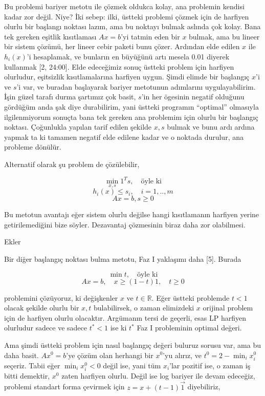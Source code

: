 \documentclass[12pt,fleqn]{article}\usepackage{../../common}
\begin{document}
Bu problemi bariyer metotu ile çözmek oldukca kolay, ana problemin kendisi
kadar zor değil. Niye? İki sebep: ilki, üstteki problemi çözmek için de
harfiyen olurlu bir başlangı noktası lazım, ama bu noktayı bulmak aslında
çok kolay. Bana tek gereken eşitlik kısıtlaması $Ax = b$'yi tatmin eden bir
$x$ bulmak, ama bu lineer bir sistem çözümü, her lineer cebir paketi bunu
çözer. Ardından elde edilen $x$ ile $h_i(x)$'i hesaplamak, ve bunların en
büyüğünü artı mesela 0.01 diyerek kullanmak [2, 24:00]. Elde edeceğimiz
sonuç üstteki problem için harfiyen olurludur, eşitsizlik kısıtlamalarına
harfiyen uygun. Şimdi elimde bir başlangıç $x$'i ve $s$'i var, ve buradan
başlayarak bariyer metotunun adımlarını uygulayabilirim. İşin güzel tarafı
durma şartımız çok basit, $s$'in her ögesinin negatif olduğunu gördüğüm
anda şak diye durabilirim, yani üstteki programın ``optimal'' olmasıyla
ilgilenmiyorum sonuçta bana tek gereken ana problemim için olurlu bir
başlangıç noktası. Çoğunlukla yapılan tarif edilen şekilde $x,s$ bulmak ve
bunu ardı ardına yapmak ta ki tamamen negatif elde edilene kadar ve o
noktada durulur, ana probleme dönülür.

Alternatif olarak şu problem de çözülebilir,

$$
\min_{x,s} 1^T s, \quad \textrm{öyle ki}
$$
$$
h_i(x) \le s_i, \quad i=1,..,m
$$
$$
Ax = b, s \ge 0
$$

Bu metotun avantajı eğer sistem olurlu değilse hangi kısıtlamanın harfiyen
yerine getirilemediğini bize söyler. Dezavantaj çözmesinin biraz daha zor
olabilmesi.

Ekler

Bir diğer başlangıç noktası bulma metotu, Faz I yaklaşımı daha [5]. Burada

$$
\min t, \quad \textrm{öyle ki}
$$
$$
Ax = b, \quad x \ge (1-t) 1, \quad t \ge 0
$$

problemini çözüyoruz, ki değişkenler $x$ ve $t \in \mathbb{R}$. Eğer
üstteki problemde $t < 1$ olacak şekilde olurlu bir $x,t$ bulabilirsek, o
zaman elimizdeki $x$ orijinal problem için de harfiyen olurlu
olacaktır. Argümanın tersi de geçerli, esas LP harfiyen olurludur sadece ve
sadece $t^\ast < 1$ ise ki $t^\ast$ Faz I probleminin optimal değeri.

Ama şimdi üstteki problem için nasıl başlangıç değeri buluruz sorusu var,
ama bu daha basit. $Ax^0 = b$'ye çözüm olan herhangi bir $x^0$'yu alırız,
ve $t^0 = 2 - \min_i x_i^0$ seçeriz. Tabii eğer $\min_i x_i^0 < 0$ değil
ise, yani tüm $x_i$'lar pozitif ise, o zaman iş bitti demektir, $x^0$ zaten
harfiyen olurlu. Değil ise log bariyer ile devam edeceğiz, problemi
standart forma çevirmek için $z = x + (t-1)\vec{1}$ diyebiliriz,
\end{document}
